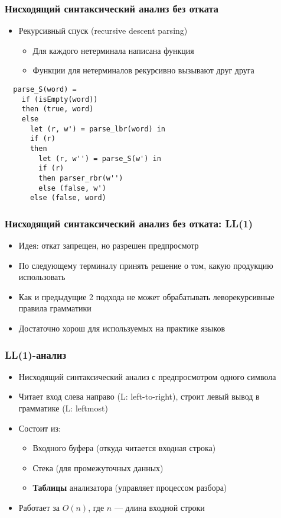 \documentclass{beamer}
\begin{document}
\begin{frame}[fragile]
  \transwipe[direction=90]
  \frametitle{Нисходящий синтаксический анализ без отката}
  \begin{itemize}
    \item Рекурсивный спуск (recursive descent parsing)
    \begin{itemize}
      \item Для каждого нетерминала написана функция
      \item Функции для нетерминалов рекурсивно вызывают друг друга
    \end{itemize}
  \end{itemize}

  \bigskip

  \begin{verbatim}
  parse_S(word) =
    if (isEmpty(word))
    then (true, word)
    else
      let (r, w') = parse_lbr(word) in
      if (r)
      then
        let (r, w'') = parse_S(w') in
        if (r)
        then parser_rbr(w'')
        else (false, w')
      else (false, word)

  \end{verbatim}
\end{frame}


\begin{frame}[fragile]
  \transwipe[direction=90]
  \frametitle{Нисходящий синтаксический анализ без отката: LL(1)}
  \begin{itemize}
    \item Идея: откат запрещен, но разрешен предпросмотр
    \item По следующему терминалу принять решение о том, какую продукцию использовать
    \item Как и предыдущие 2 подхода не может обрабатывать леворекурсивные правила грамматики
    \item Достаточно хорош для используемых на практике языков
  \end{itemize}
\end{frame}


\begin{frame}[fragile]
  \transwipe[direction=90]
  \frametitle{LL(1)-анализ}
  \begin{itemize}
   \item Нисходящий синтаксический анализ с предпросмотром одного символа
   \item Читает вход слева направо (L: left-to-right), строит левый вывод в грамматике (L: leftmost)
   \item Состоит из:
   \begin{itemize}
     \item Входного буфера (откуда читается входная строка)
     \item Стека (для промежуточных данных)
     \item \textbf{Таблицы} анализатора (управляет процессом разбора)
   \end{itemize}
   \item Работает за $O(n)$, где $n$ --- длина входной строки
  \end{itemize}
\end{frame}
\end{document}
